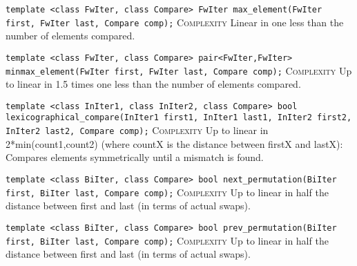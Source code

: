 \noindent{}\hspace*{0.25em}\lstinline[basicstyle=\ttfamily\color{corange}]{template <class FwIter, class Compare> FwIter max_element(FwIter first, FwIter last, Compare comp);} \textsc{Complexity} Linear in one less than the number of elements compared.\\\vspace{-0.6em}

\noindent{}\hspace*{0.25em}\lstinline[basicstyle=\ttfamily\color{corange}]{template <class FwIter, class Compare> pair<FwIter,FwIter> minmax_element(FwIter first, FwIter last, Compare comp);} \textsc{Complexity} Up to linear in 1.5 times one less than the number of elements compared.\\\vspace{-0.6em}

\noindent{}\hspace*{0.25em}\lstinline[basicstyle=\ttfamily\color{corange}]{template <class InIter1, class InIter2, class Compare> bool lexicographical_compare(InIter1 first1, InIter1 last1, InIter2 first2, InIter2 last2, Compare comp);} \textsc{Complexity} Up to linear in 2*min(count1,count2) (where countX is the distance between firstX and lastX): Compares elements symmetrically until a mismatch is found.\\\vspace{-0.6em}

\noindent{}\hspace*{0.25em}\lstinline[basicstyle=\ttfamily\color{corange}]{template <class BiIter, class Compare> bool next_permutation(BiIter first, BiIter last, Compare comp);} \textsc{Complexity} Up to linear in half the distance between first and last (in terms of actual swaps).\\\vspace{-0.6em}

\noindent{}\hspace*{0.25em}\lstinline[basicstyle=\ttfamily\color{corange}]{template <class BiIter, class Compare> bool prev_permutation(BiIter first, BiIter last, Compare comp);} \textsc{Complexity} Up to linear in half the distance between first and last (in terms of actual swaps).\\\vspace{-0.6em}

